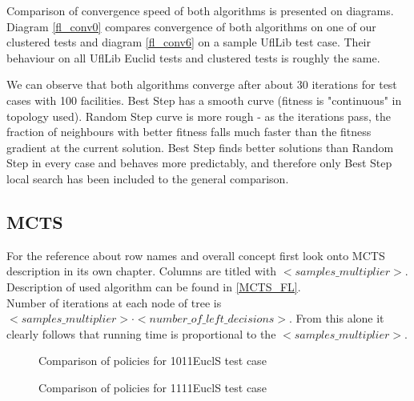 Comparison of convergence speed of both algorithms is presented on diagrams.
Diagram \ref{fl_conv0} compares convergence of both algorithms on one of our clustered tests
and diagram \ref{fl_conv6} on a sample UflLib test case. Their behaviour on all UflLib Euclid
tests and clustered tests is roughly the same.

We can observe that both algorithms converge after about 30 iterations for test cases with
100 facilities. Best Step has a smooth curve (fitness is "continuous" in topology used).
Random Step curve is more rough - as the iterations pass, the fraction of neighbours with better fitness
falls much faster than the fitness gradient at the current solution.
Best Step finds better solutions than Random Step in every case and behaves more predictably,
and therefore only Best Step local search has been included to the general comparison.

\FloatBarrier


\FloatBarrier

\begin{figure}[ht]
  
\end{figure}

\subsection{MCTS}

For the reference about row names and overall concept first look onto MCTS description in its own chapter.
Columns are titled with $<samples\_multiplier>$. \\
Description of used algorithm can be found in \ref{MCTS_FL}. \\
Number of iterations at each node of tree is $<samples\_multiplier> \cdot <number\_of\_left\_decisions>$.
From this alone it clearly follows that running time is proportional to the $<samples\_multiplier>$.

\FloatBarrier
\begin{figure}[ht]
  
  \caption{Comparison of policies for 1011EuclS test case}
\end{figure}

\begin{figure}[ht]
  
  \caption{Comparison of policies for 1111EuclS test case}
\end{figure}

